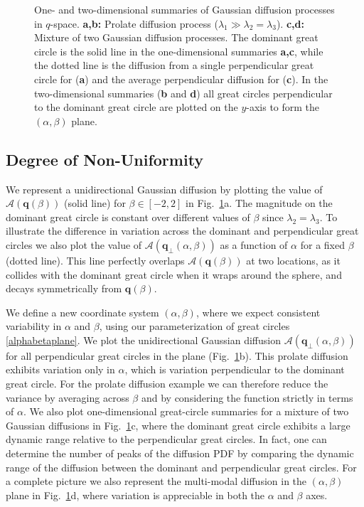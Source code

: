 \documentclass[dvips,aoas,preprint]{imsart}
\numberwithin{equation}{section}
\theoremstyle{plain}
\newcommand{\q}{\mathbf{q}}
\newcommand{\cA}{\mathcal{A}}
\begin{document}
\begin{figure}[!htbp]
\begin{minipage}[]{0.35\textwidth}
    \end{minipage}
  \caption{One- and two-dimensional summaries of Gaussian diffusion
    processes in $q$-space.  {\bf a,b:} Prolate diffusion process
    ($\lambda_1\gg\lambda_2=\lambda_3$). {\bf c,d:} Mixture of two
    Gaussian diffusion processes.  The dominant great circle is the
    solid line in the one-dimensional summaries {\bf a,c}, while the
    dotted line is the diffusion from a single perpendicular great
    circle for ({\bf a}) and the average perpendicular diffusion for
    ({\bf c}).  In the two-dimensional summaries ({\bf b} and {\bf d})
    all great circles perpendicular to the dominant great circle are
    plotted on the $y$-axis to form the $(\alpha,\beta)$ plane.}
  \label{fig:Gaussian-PDF}
\end{figure}

\subsection{Degree of Non-Uniformity}

We represent a unidirectional Gaussian diffusion by plotting the value
of $\cA(\q(\beta))$ (solid line) for $\beta\in[-2,2]$ in
Fig.~\ref{fig:Gaussian-PDF}a.  The magnitude on the dominant great
circle is constant over different values of $\beta$ since
$\lambda_2=\lambda_3$.  To illustrate the difference in variation
across the dominant and perpendicular great circles we also plot the
value of $\cA(\q_{\perp}(\alpha,\beta))$ as a function of $\alpha$ for
a fixed $\beta$ (dotted line).  This line perfectly overlaps
$\cA(\q(\beta))$ at two locations, as it collides with the dominant
great circle when it wraps around the sphere, and decays symmetrically
from $\q(\beta)$.

We define a new coordinate system $(\alpha,\beta)$, where we expect
consistent variability in $\alpha$ and $\beta$, using our
parameterization of great circles \eqref{alphabetaplane}.  We plot the
unidirectional Gaussian diffusion $\cA(\q_{\perp}(\alpha,\beta))$ for
all perpendicular great circles in the plane
(Fig.~\ref{fig:Gaussian-PDF}b).  This prolate diffusion exhibits
variation only in $\alpha$, which is variation perpendicular to the
dominant great circle.  For the prolate diffusion example we can
therefore reduce the variance by averaging across $\beta$ and by
considering the function strictly in terms of $\alpha$.  We also plot
one-dimensional great-circle summaries for a mixture of two Gaussian
diffusions in Fig.~\ref{fig:Gaussian-PDF}c, where the dominant great
circle exhibits a large dynamic range relative to the perpendicular
great circles.  In fact, one can determine the number of peaks of the
diffusion PDF by comparing the dynamic range of the diffusion between
the dominant and perpendicular great circles.  For a complete picture
we also represent the multi-modal diffusion in the $(\alpha,\beta)$
plane in Fig.~\ref{fig:Gaussian-PDF}d, where variation is appreciable
in both the $\alpha$ and $\beta$ axes.
\end{document}
